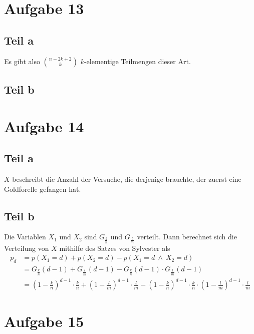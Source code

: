 \documentclass[10pt,a4paper]{article}
\begin{document}
\section{Aufgabe 13}

\subsection{Teil a}
Es gibt also $\binom{n - 2k + 2}{k}$ $k$-elementige Teilmengen dieser Art.

\subsection{Teil b}

\section{Aufgabe 14}

\subsection{Teil a}
$X$ beschreibt die Anzahl der Versuche, die derjenige brauchte, der zuerst eine Goldforelle gefangen hat.

\subsection{Teil b}
Die Variablen $X_{1}$ und $X_{2}$ sind $G_{\frac{k}{n}}$ und $G_{\frac{l}{m}}$ verteilt.
Dann berechnet sich die Verteilung von $X$ mithilfe des Satzes von Sylvester als
\begin{align*}
  p_{d} & = p(X_{1} = d) + p(X_{2} = d) - p(X_{1} = d\ \land\ X_{2} = d)\\
  & = G_{\frac{k}{n}}(d - 1) + G_{\frac{l}{m}}(d - 1) - G_{\frac{k}{n}}(d - 1) \cdot G_{\frac{l}{m}}(d - 1)\\
  & = (1 - \frac{k}{n})^{d - 1} \cdot \frac{k}{n} + (1 - \frac{l}{m})^{d - 1} \cdot \frac{l}{m} - (1 - \frac{k}{n})^{d - 1} \cdot \frac{k}{n} \cdot (1 - \frac{l}{m})^{d - 1} \cdot \frac{l}{m}
\end{align*}

\section{Aufgabe 15}
\end{document}
